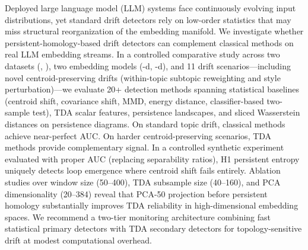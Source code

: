 Deployed large language model (LLM) systems face continuously evolving input distributions, yet standard drift detectors rely on low-order statistics that may miss structural reorganization of the embedding manifold. We investigate whether persistent-homology-based drift detectors can complement classical methods on real LLM embedding streams. In a controlled comparative study across two datasets (\agnews, \twentyng), two embedding models (-d, -d), and 11 drift scenarios---including novel centroid-preserving drifts (within-topic subtopic reweighting and style perturbation)---we evaluate 20+ detection methods spanning statistical baselines (centroid shift, covariance shift, MMD, energy distance, classifier-based two-sample test), TDA scalar features, persistence landscapes, and sliced Wasserstein distances on persistence diagrams. On standard topic drift, classical methods achieve near-perfect AUC. On harder centroid-preserving scenarios, TDA methods provide complementary signal. In a controlled synthetic experiment evaluated with proper AUC (replacing separability ratios), H1 persistent entropy uniquely detects loop emergence where centroid shift fails entirely. Ablation studies over window size (50--400), TDA subsample size (40--160), and PCA dimensionality (20--384) reveal that PCA-50 projection before persistent homology substantially improves TDA reliability in high-dimensional embedding spaces. We recommend a two-tier monitoring architecture combining fast statistical primary detectors with TDA secondary detectors for topology-sensitive drift at modest computational overhead.
